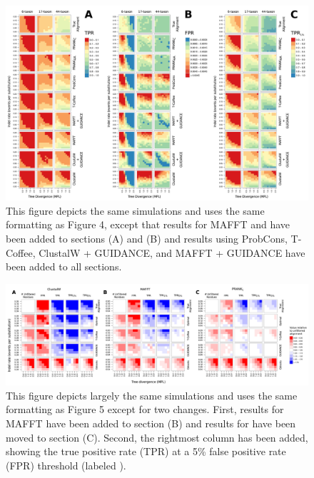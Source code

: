 \begin{landscape}
\begin{figure}
\centering
\includegraphics[scale=0.65]{Figs/supp_fig1.pdf}
\caption{This figure depicts the same simulations and uses the same
  formatting as Figure 4, except that results for MAFFT and \pranka
  have been added to sections (A) and (B) and results using ProbCons,
  T-Coffee, ClustalW + GUIDANCE, and MAFFT + GUIDANCE have been added
  to all sections.}
\label{fig_s1}
\end{figure}
\end{landscape}

\begin{landscape}
\begin{figure}
\centering
\includegraphics[scale=0.55]{Figs/supp_fig2.pdf}
\caption{This figure depicts largely the same simulations and uses the
  same formatting as Figure 5 except for two changes. First,
  results for MAFFT have been added to section (B) and results for
  \prankc have been moved to section (C). Second, the rightmost column
  has been added, showing the true positive rate (TPR) at a 5\% false
  positive rate (FPR) threshold (labeled \tprf).}
\label{fig_s2}
\end{figure}
\end{landscape}
